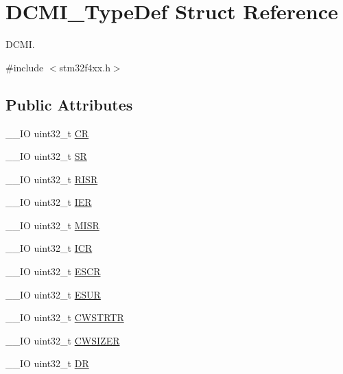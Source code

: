 \hypertarget{struct_d_c_m_i___type_def}{}\section{D\+C\+M\+I\+\_\+\+Type\+Def Struct Reference}
\label{struct_d_c_m_i___type_def}


D\+C\+M\+I.  




{\ttfamily \#include $<$stm32f4xx.\+h$>$}

\subsection*{Public Attributes}
\begin{DoxyCompactItemize}
\item 
\+\_\+\+\_\+\+I\+O uint32\+\_\+t \hyperlink{struct_d_c_m_i___type_def_a3cfcc9860ca551cbcb10c1c3dd4304f0}{C\+R}
\item 
\+\_\+\+\_\+\+I\+O uint32\+\_\+t \hyperlink{struct_d_c_m_i___type_def_a1bbe4b3cc5d9552526bec462b42164d5}{S\+R}
\item 
\+\_\+\+\_\+\+I\+O uint32\+\_\+t \hyperlink{struct_d_c_m_i___type_def_ae0aba9f38498cccbe0186b7813825026}{R\+I\+S\+R}
\item 
\+\_\+\+\_\+\+I\+O uint32\+\_\+t \hyperlink{struct_d_c_m_i___type_def_a91ce93b57d8382147574c678ee497c63}{I\+E\+R}
\item 
\+\_\+\+\_\+\+I\+O uint32\+\_\+t \hyperlink{struct_d_c_m_i___type_def_ab367c4ca2e8ac87238692e6d55d622ec}{M\+I\+S\+R}
\item 
\+\_\+\+\_\+\+I\+O uint32\+\_\+t \hyperlink{struct_d_c_m_i___type_def_a0371fc07916e3043e1151eaa97e172c9}{I\+C\+R}
\item 
\+\_\+\+\_\+\+I\+O uint32\+\_\+t \hyperlink{struct_d_c_m_i___type_def_a52c16b920a3f25fda961d0cd29749433}{E\+S\+C\+R}
\item 
\+\_\+\+\_\+\+I\+O uint32\+\_\+t \hyperlink{struct_d_c_m_i___type_def_af00a94620e33f4eff74430ff25c12b94}{E\+S\+U\+R}
\item 
\+\_\+\+\_\+\+I\+O uint32\+\_\+t \hyperlink{struct_d_c_m_i___type_def_a4d58830323e567117c12ae3feac613b9}{C\+W\+S\+T\+R\+T\+R}
\item 
\+\_\+\+\_\+\+I\+O uint32\+\_\+t \hyperlink{struct_d_c_m_i___type_def_a1b9c8048339e19b110ecfbea486f55df}{C\+W\+S\+I\+Z\+E\+R}
\item 
\+\_\+\+\_\+\+I\+O uint32\+\_\+t \hyperlink{struct_d_c_m_i___type_def_a266cec1031b0be730b0e35523f5e2934}{D\+R}
\end{DoxyCompactItemize}


